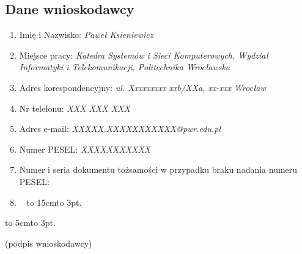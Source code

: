 \thispagestyle{empty}
\begin{fullwidth}

\chapter{Dane wnioskodawcy}


\vfill
{
\large
\begin{enumerate}
	\item Imię i Nazwisko: \emph{Paweł Ksieniewicz}
	\item Miejsce pracy: \emph{Katedra Systemów i Sieci Komputerowych, Wydział Informatyki i Telekomunikacji, Politechnika Wrocławska}
	\item Adres korespondencyjny: \emph{ul. Xxxxxxxxx xxb/XXa, xx-xxx Wrocław}
	\item Nr telefonu: \emph{XXX XXX XXX}
	\item Adres e-mail: \emph{XXXXX.XXXXXXXXXXX@pwr.edu.pl}
	\item Numer PESEL: \emph{XXXXXXXXXXX}
	\item Numer i seria dokumentu tożsamości w przypadku braku nadania numeru PESEL:
	\item[]~ \hbox to 15cm{\leaders\hbox to 3pt{\hss . \hss}\hfil} 
\end{enumerate}
}

\vfill\noindent\hspace{.75\textwidth}\begin{minipage}{15em}
\begin{center}
	\hbox to 5cm{\leaders\hbox to 3pt{\hss . \hss}\hfil}

	(podpis wnioskodawcy)
\end{center}
\end{minipage}

\vfill


\end{fullwidth}
